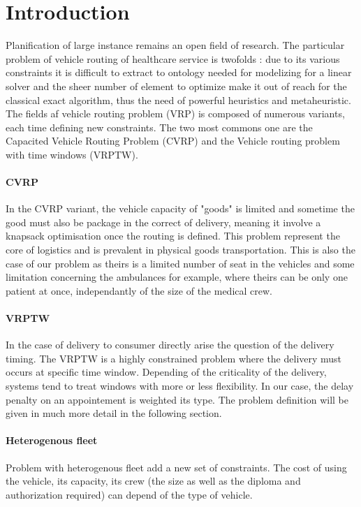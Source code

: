 \documentclass[12pt]{memoir}
\begin{document}
\section{Introduction}
Planification of large instance remains an open field of research. The particular
problem of vehicle routing of healthcare service is twofolds : due to its
various constraints it is difficult to extract to ontology needed for modelizing for
a linear solver and the sheer number of element to optimize make it out of reach for
the classical exact algorithm, thus the need of powerful heuristics and 
metaheuristic. The fields af vehicle routing problem (VRP) is composed of numerous variants, each time defining new constraints. The two most commons one are the Capacited Vehicle Routing Problem (CVRP) and the Vehicle routing problem with time windows (VRPTW).

\paragraph{CVRP} %
\label{par:CVRP}
In the CVRP variant, the vehicle capacity of "goods" is limited and sometime the
good must also be package in the correct of delivery, meaning it involve a knapsack
optimisation once the routing is defined. This problem represent the core of
logistics and is prevalent in physical goods transportation. This is also the case
of our problem as theirs is a limited number of seat in the vehicles and some
limitation concerning the ambulances for example, where theirs can be only one
patient at once, independantly of the size of the medical crew.

\paragraph{VRPTW} %
\label{par:VRPTW}
In the case of delivery to consumer directly arise the question of the delivery
timing. The VRPTW is a highly constrained problem where the delivery must occurs
at specific time window. Depending of the criticality of the delivery, systems tend
to treat windows with more or less flexibility. In our case, the delay penalty on an
appointement is weighted its type. The problem definition will be given in much more
detail in the following section.

\paragraph{Heterogenous fleet} %
\label{par:Heterogenous fleet}
Problem with heterogenous fleet add a new set of constraints. The cost of using
the vehicle, its capacity, its crew (the size as well as the diploma and
authorization required) can depend of the type of vehicle.
\end{document}
